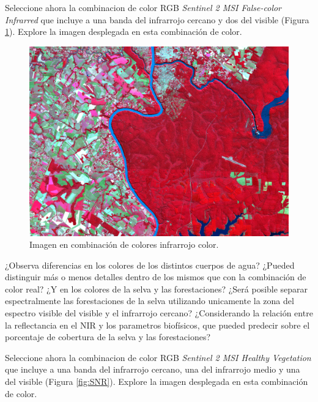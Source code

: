 \documentclass[a4paper,10pt]{book}
\begin{document}
Seleccione ahora la combinacion de color RGB \emph{Sentinel 2 MSI False-color Infrarred} que incluye a una banda del infrarrojo cercano y dos del visible (Figura \ref{fig:NRG}). Explore la imagen desplegada en esta combinación de color.

\begin{figure}[h!]
    \centering
    \includegraphics[scale=0.5]{fig:NRG.png}
    \caption{Imagen en combinación de colores infrarrojo color.}
    \label{fig:NRG}
\end{figure}

\begin{que}
    ¿Observa diferencias en los colores de los distintos cuerpos de agua? ¿Pueded distinguir más o menos detalles dentro de los mismos que con la combinación de color real? ¿Y en los colores de la selva y las forestaciones? ¿Será posible separar espectralmente las forestaciones de la selva utilizando unicamente la zona del espectro visible del visible y el infrarrojo cercano? ¿Considerando la relación entre la reflectancia en el NIR y los parametros biofísicos, que pueded predecir sobre el porcentaje de cobertura de la selva y las forestaciones?
\end{que}

Seleccione ahora la combinacion de color RGB \emph{Sentinel 2 MSI Healthy Vegetation} que incluye a una banda del infrarrojo cercano, una del infrarrojo medio y una del visible (Figura \ref{fig:SNR}). Explore la imagen desplegada en esta combinación de color.
\end{document}
